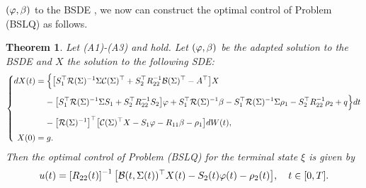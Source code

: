 \documentclass[11pt,times,twoside]{article}
\def\b{\beta}         \def\D{\Delta}   \def\d{\delta}   \def\F{\Phi}     \def\p{\phi}
\def\ba{\begin{aligned}}              \def\ea{\end{aligned}}
\newtheorem{theorem}{Theorem}[section]
\begin{document}
$(\f,\b)$ to the BSDE , we now can construct the optimal control of Problem (BSLQ) as
follows.
%
\begin{theorem}\label{Thm4.2}
Let (A1)-(A3) and  hold. Let $(\f,\b)$ be the adapted solution to the
BSDE  and $X$ the solution to the following SDE:
%
\begin{equation}\label{4.4}\left\{\ba
\ds dX(t) &=\Big\{\big[S_{1}^{\top} \mathcal{R}(\Si)^{-1} \Si\mathcal{C}(\Si)^{\top}+S_{2}^{\top} R_{22}^{-1} \mathcal{B}(\Si)^{\top}-A^{\top}\big] X\\
%
\ns\ds &\hp{=\ } -\big[S_{1}^{\top} \mathcal{R}(\Si)^{-1}\Si S_{1}+S_{2}^{\top}R_{22}^{-1}S_{2}\big]\varphi
+S_{1}^{\top} \cR(\Si)^{-1} \beta-S_{1}^{\top} \cR(\Si)^{-1} \Si\rho_1-S_{2}^{\top} R_{22}^{-1}\rho_2+q \Big\} d t \\
%
\ns\ds &\hp{=\ } - \big[\cR(\Si)^{-1}\big]^{\top} \big[\mathcal{C}(\Si)^{\top} X-S_{1} \varphi-R_{11} \beta -\rho_1\big]  d W(t), \\
\ns\ds X(0)&= g .
\end{aligned}\right.
\end{equation}
%
Then the optimal control of Problem (BSLQ) for the terminal state $\xi$ is given by
%
\begin{equation}\label{4.5}
u(t)=\left[R_{22}(t)\right]^{-1}\big[\mathcal{B}(t, \Sigma(t))^{\top} X(t)-S_{2}(t) \varphi(t)
-\rho_2(t) \big], \quad t \in[0, T] .
\end{equation}
%
\end{theorem}
\end{document}
